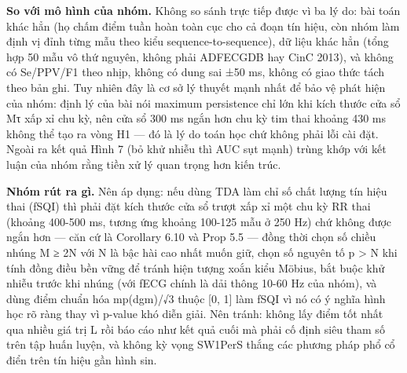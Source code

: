 \documentclass[12pt,a4paper]{article}
\begin{document}
\noindent \textbf{\color{tdtblue}So với mô hình của nhóm.} Không so sánh trực tiếp được vì ba lý do: bài toán khác hẳn (họ chấm điểm tuần hoàn toàn cục cho cả đoạn tín hiệu, còn nhóm làm định vị đỉnh từng mẫu theo kiểu sequence-to-sequence), dữ liệu khác hẳn (tổng hợp 50 mẫu vô thứ nguyên, không phải ADFECGDB hay CinC 2013), và không có Se/PPV/F1 theo nhịp, không có dung sai ±50 ms, không có giao thức tách theo bản ghi. Tuy nhiên đây là cơ sở lý thuyết mạnh nhất để bảo vệ phát hiện của nhóm: định lý của bài nói maximum persistence chỉ lớn khi kích thước cửa sổ Mτ xấp xỉ chu kỳ, nên cửa sổ 300 ms ngắn hơn chu kỳ tim thai khoảng 430 ms không thể tạo ra vòng H1 — đó là lý do toán học chứ không phải lỗi cài đặt. Ngoài ra kết quả Hình 7 (bỏ khử nhiễu thì AUC sụt mạnh) trùng khớp với kết luận của nhóm rằng tiền xử lý quan trọng hơn kiến trúc.\par\vspace{3pt}
\noindent \textbf{\color{tdtblue}Nhóm rút ra gì.} Nên áp dụng: nếu dùng TDA làm chỉ số chất lượng tín hiệu thai (fSQI) thì phải đặt kích thước cửa sổ trượt xấp xỉ một chu kỳ RR thai (khoảng 400-500 ms, tương ứng khoảng 100-125 mẫu ở 250 Hz) chứ không được ngắn hơn — căn cứ là Corollary 6.10 và Prop 5.5 — đồng thời chọn số chiều nhúng M ≥ 2N với N là bậc hài cao nhất muốn giữ, chọn số nguyên tố p > N khi tính đồng điều bền vững để tránh hiện tượng xoắn kiểu Möbius, bắt buộc khử nhiễu trước khi nhúng (với fECG chính là dải thông 10-60 Hz của nhóm), và dùng điểm chuẩn hóa mp(dgm)/√3 thuộc [0, 1] làm fSQI vì nó có ý nghĩa hình học rõ ràng thay vì p-value khó diễn giải. Nên tránh: không lấy điểm tốt nhất qua nhiều giá trị L rồi báo cáo như kết quả cuối mà phải cố định siêu tham số trên tập huấn luyện, và không kỳ vọng SW1PerS thắng các phương pháp phổ cổ điển trên tín hiệu gần hình sin.\par\vspace{3pt}
\vspace{6pt}
\end{document}
